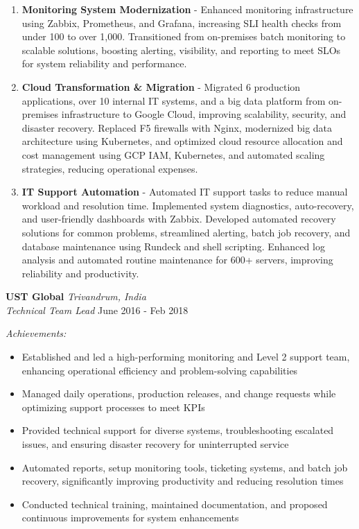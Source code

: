 \documentclass[11pt]{article}
\begin{document}
\begin{enumerate}
		\item \textbf{Monitoring System Modernization} - Enhanced monitoring infrastructure using Zabbix, Prometheus, and Grafana, increasing SLI health checks from under 100 to over 1,000. Transitioned from on-premises batch monitoring to scalable solutions, boosting alerting, visibility, and reporting to meet SLOs for system reliability and performance.
		\item \textbf{Cloud Transformation \& Migration} - Migrated 6 production applications, over 10 internal IT systems, and a big data platform from on-premises infrastructure to Google Cloud, improving scalability, security, and disaster recovery. Replaced F5 firewalls with Nginx, modernized big data architecture using Kubernetes, and optimized cloud resource allocation and cost management using GCP IAM, Kubernetes, and automated scaling strategies, reducing operational expenses.
		\item \textbf{IT Support Automation} - Automated IT support tasks to reduce manual workload and resolution time. Implemented system diagnostics, auto-recovery, and user-friendly dashboards with Zabbix. Developed automated recovery solutions for common problems, streamlined alerting, batch job recovery, and database maintenance using Rundeck and shell scripting. Enhanced log analysis and automated routine maintenance for 600+ servers, improving reliability and productivity.
	\end{enumerate}
	\newpage
	
	\textbf{UST Global} \hfill \textit{Trivandrum, India} \\
	\textit{Technical Team Lead} \hfill June 2016 - Feb 2018
	
	\textit{Achievements:}
	\begin{itemize}
		\item Established and led a high-performing monitoring and Level 2 support team, enhancing operational efficiency and problem-solving capabilities
		\item Managed daily operations, production releases, and change requests while optimizing support processes to meet KPIs
		\item Provided technical support for diverse systems, troubleshooting escalated issues, and ensuring disaster recovery for uninterrupted service
		\item Automated reports, setup monitoring tools, ticketing systems, and batch job recovery, significantly improving productivity and reducing resolution times
		\item Conducted technical training, maintained documentation, and proposed continuous improvements for system enhancements
	\end{itemize}
	
\end{document}
